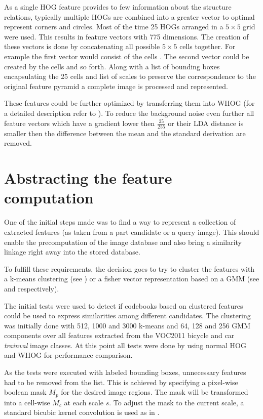 As a single \ac{HOG} feature provides to few information about the structure relations, typically multiple \acp{HOG} are combined into a greater vector to optimal represent corners and circles. Most of the time 25 \acp{HOG} arranged in a $5\times5$ grid were used. This results in feature vectors with 775 dimensions. The creation of these vectors is done by concatenating all possible $5\times5$ cells together. For example the first vector would consist of the cells . The second vector could be created by the cells  and so forth. Along with a list of bounding boxes encapsulating the 25 cells and list of scales to preserve the correspondence to the original feature pyramid a complete image is processed and represented.
\par
These features could be further optimized by transferring them into \ac{WHOG} (for a detailed description refer to ). To reduce the background noise even further all feature vectors which have a gradient lower then $\frac{25}{255}$ or their \ac{LDA} distance is smaller then the difference between the mean and the standard derivation are removed.

\section{Abstracting the feature computation}

One of the initial steps made was to find a way to represent a collection of extracted features (as taken from a part candidate or a query image). This should enable the precomputation of the image database and also bring a similarity linkage right away into the stored database.

To fulfill these requirements, the decision goes to try to cluster the features with a k-means clustering (see ) or a fisher vector representation based on a \acf{GMM} (see  and  respectively).
\par
The initial tests were used to detect if codebooks based on clustered features could be used to express similarities among different candidates.
The clustering was initially done with 512, 1000 and 3000 k-means and 64, 128 and 256 \ac{GMM} components over all features extracted from the \ac{VOC2011} bicycle and car \textit{trainval} image classes.
At this point all tests were done by using normal \ac{HOG} and \acl{WHOG} for performance comparison.
\par
As the tests were executed with labeled bounding boxes, unnecessary features had to be removed from the list. This is achieved by specifying a pixel-wise boolean mask $M_p$ for the desired image regions. The mask will be transformed into a cell-wise $M_c$ at each scale $s$. To adjust the mask to the current scale, a standard bicubic kernel convolution is used as in .

